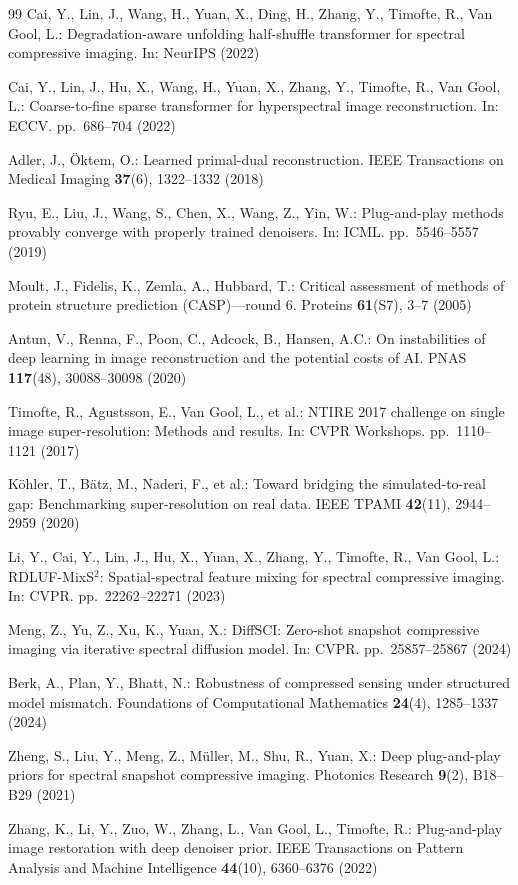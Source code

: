 \documentclass[runningheads]{llncs}
\begin{document}
\begin{thebibliography}{99}
Cai, Y., Lin, J., Wang, H., Yuan, X., Ding, H., Zhang, Y., Timofte, R., Van Gool, L.:
Degradation-aware unfolding half-shuffle transformer for spectral compressive imaging.
In: NeurIPS (2022)

Cai, Y., Lin, J., Hu, X., Wang, H., Yuan, X., Zhang, Y., Timofte, R., Van Gool, L.:
Coarse-to-fine sparse transformer for hyperspectral image reconstruction.
In: ECCV. pp.~686--704 (2022)


Adler, J., {\"O}ktem, O.:
Learned primal-dual reconstruction.
IEEE Transactions on Medical Imaging \textbf{37}(6), 1322--1332 (2018)

Ryu, E., Liu, J., Wang, S., Chen, X., Wang, Z., Yin, W.:
Plug-and-play methods provably converge with properly trained denoisers.
In: ICML. pp.~5546--5557 (2019)

Moult, J., Fidelis, K., Zemla, A., Hubbard, T.:
Critical assessment of methods of protein structure prediction (CASP)---round 6.
Proteins \textbf{61}(S7), 3--7 (2005)


Antun, V., Renna, F., Poon, C., Adcock, B., Hansen, A.C.:
On instabilities of deep learning in image reconstruction and the potential costs of AI.
PNAS \textbf{117}(48), 30088--30098 (2020)

Timofte, R., Agustsson, E., Van Gool, L., et al.:
NTIRE 2017 challenge on single image super-resolution: Methods and results.
In: CVPR Workshops. pp.~1110--1121 (2017)

K{\"o}hler, T., B{\"a}tz, M., Naderi, F., et al.:
Toward bridging the simulated-to-real gap: Benchmarking super-resolution on real data.
IEEE TPAMI \textbf{42}(11), 2944--2959 (2020)

Li, Y., Cai, Y., Lin, J., Hu, X., Yuan, X., Zhang, Y., Timofte, R., Van Gool, L.:
RDLUF-MixS$^2$: Spatial-spectral feature mixing for spectral compressive imaging.
In: CVPR. pp.~22262--22271 (2023)

Meng, Z., Yu, Z., Xu, K., Yuan, X.:
DiffSCI: Zero-shot snapshot compressive imaging via iterative spectral diffusion model.
In: CVPR. pp.~25857--25867 (2024)

Berk, A., Plan, Y., Bhatt, N.:
Robustness of compressed sensing under structured model mismatch.
Foundations of Computational Mathematics \textbf{24}(4), 1285--1337 (2024)


Zheng, S., Liu, Y., Meng, Z., M{\"u}ller, M., Shu, R., Yuan, X.:
Deep plug-and-play priors for spectral snapshot compressive imaging.
Photonics Research \textbf{9}(2), B18--B29 (2021)

Zhang, K., Li, Y., Zuo, W., Zhang, L., Van Gool, L., Timofte, R.:
Plug-and-play image restoration with deep denoiser prior.
IEEE Transactions on Pattern Analysis and Machine Intelligence \textbf{44}(10), 6360--6376 (2022)

\end{thebibliography}
\end{document}
